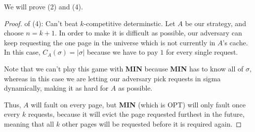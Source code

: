\documentclass[11pt]{article}
\begin{document}
We will prove (2) and (4).

\begin{proof}
	of (4): Can't beat $k$-competitive determinstic. Let $A$ be our strategy, and choose $n = k+1$. In order to make it is difficult as possible, our adversary can keep requesting the one page in the universe which is not currently in $A$'s cache. In this case, $C_A(\sigma) = |\sigma|$ because we have to pay $1$ for every single request. 
	
	Note that we can't play this game with {\bf MIN} because {\bf MIN} has to know all of $\sigma$, whereas in this case we are letting our adversary pick requests in sigma dynamically, making it as hard for $A$ as possible. 
	
	Thus, $A$ will fault on every page, but {\bf MIN} (which is OPT) will only fault once every $k$ requests, because it will evict the page requested furthest in the future, meaning that all $k$ other pages will be requested before it is required again.

\end{proof}
\end{document}
